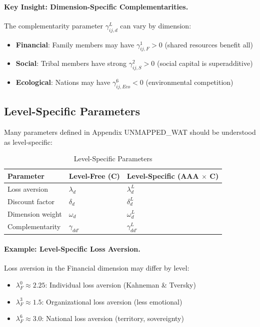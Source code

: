 \paragraph{Key Insight: Dimension-Specific Complementarities.}

The complementarity parameter $\gamma^L_{ij,d}$ can vary by dimension:

\begin{itemize}[nosep]
\item \textbf{Financial}: Family members may have $\gamma^1_{ij,F} > 0$ (shared resources benefit all)
\item \textbf{Social}: Tribal members have strong $\gamma^2_{ij,S} > 0$ (social capital is superadditive)
\item \textbf{Ecological}: Nations may have $\gamma^6_{ij,Eco} < 0$ (environmental competition)
\end{itemize}

\subsection{Level-Specific Parameters}

Many parameters defined in Appendix UNMAPPED_WAT should be understood as level-specific:

\begin{table}[htbp]
\centering
\caption{Level-Specific Parameters}
\label{tab:app-c-level-params}
\renewcommand{\arraystretch}{1.3}
\begin{tabular}{@{}lll@{}}
\toprule
\textbf{Parameter} & \textbf{Level-Free (C)} & \textbf{Level-Specific (AAA $\times$ C)} \\
\midrule
Loss aversion & $\lambda_d$ & $\lambda^L_d$ \\
Discount factor & $\delta_d$ & $\delta^L_d$ \\
Dimension weight & $\omega_d$ & $\omega^L_d$ \\
Complementarity & $\gamma_{dd'}$ & $\gamma^L_{dd'}$ \\
\bottomrule
\end{tabular}
\end{table}

\paragraph{Example: Level-Specific Loss Aversion.}

Loss aversion in the Financial dimension may differ by level:

\begin{itemize}[nosep]
\item $\lambda^0_F \approx 2.25$: Individual loss aversion (Kahneman \& Tversky)
\item $\lambda^3_F \approx 1.5$: Organizational loss aversion (less emotional)
\item $\lambda^6_F \approx 3.0$: National loss aversion (territory, sovereignty)
\end{itemize}

